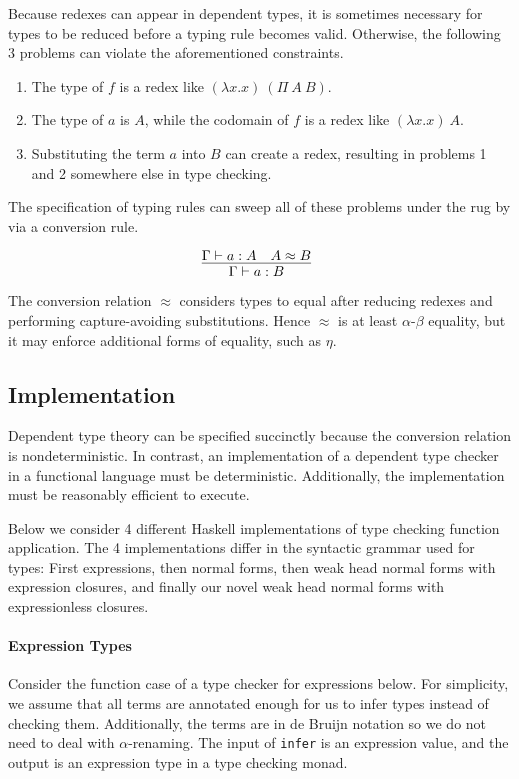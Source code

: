 \documentclass[preprint,authoryear]{sigplanconf}
\def\turnstyle{\vdash}
\def\conv{\approx}
\begin{document}
Because redexes can appear in dependent types, it is sometimes
necessary for types to be reduced before a typing rule becomes valid.
Otherwise, the following 3 problems can violate the aforementioned
constraints.

\begin{enumerate}
\item The type of $f$ is a redex like $(\lambda x. x)~(\Pi~A~B)$.
\item The type of $a$ is $A$, while the codomain of $f$ is a redex like
$(\lambda x. x)~A$.
\item Substituting the term $a$ into $B$ can create a redex, resulting
  in problems 1 and 2 somewhere else in type checking.
\end{enumerate}

The specification of typing rules can sweep all of these
problems under the rug by via a conversion rule.

$$
\infer[]
  {\Gamma \turnstyle a : B}
{
  \Gamma \turnstyle a : A
  &
  A \conv B
}
$$

The conversion relation $\conv$ considers types to equal after
reducing redexes and performing capture-avoiding substitutions. Hence $\conv$ is at least $\alpha$-$\beta$
equality, but it may enforce additional forms of equality, such as $\eta$.

\subsection{Implementation}

Dependent type theory can be specified succinctly because the
conversion relation is nondeterministic. In contrast, an
implementation of a dependent type checker in a functional language
must be deterministic. Additionally, the implementation must be
reasonably efficient to execute. 

Below we consider 4 different Haskell implementations of type checking
function application. The 4 implementations differ in the syntactic
grammar used for types: First expressions, then normal forms, then
weak head normal forms with expression closures, and finally our novel
weak head normal forms with expressionless closures.

\paragraph{Expression Types}

Consider the function case of a type checker for expressions below.
For simplicity, we assume that all terms are annotated enough for us
to infer types instead of checking them. Additionally, the terms are
in de Bruijn notation so we do not need to deal with $\alpha$-renaming.
The input of \texttt{infer} is an expression
value, and the output is an expression type in a type checking monad.
\end{document}
